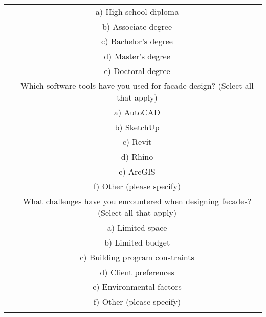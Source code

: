 \begin{table*}[!htb]
\begin{tabular}{c c}
\begin{minipage}{.48\linewidth}
\begin{tabularx}{\linewidth}{p{0.125cm}X}
            & a) High school diploma \\
            & b) Associate degree \\
            & c) Bachelor's degree \\
            & d) Master's degree \\
            & e) Doctoral degree \\
            \addlinespace
            4 & Which software tools have you used for facade design? (Select all that apply) \\
            & a) AutoCAD \\
            & b) SketchUp \\
            & c) Revit \\
            & d) Rhino \\
            & e) ArcGIS \\
            & f) Other (please specify) \\
            \addlinespace
            5 & What challenges have you encountered when designing facades? (Select all that apply) \\
            & a) Limited space \\
            & b) Limited budget \\
            & c) Building program constraints \\
            & d) Client preferences \\
            & e) Environmental factors \\
            & f) Other (please specify) \\

            \bottomrule


\end{tabularx}
\end{minipage}
\end{tabular}
\end{table*}
